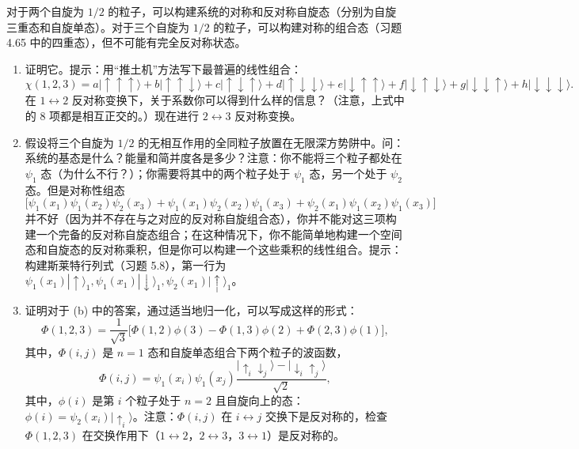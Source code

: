 \begin{question}
对于两个自旋为 $1/2$ 的粒子，可以构建系统的对称和反对称自旋态（分别为自旋三重态和自旋单态）。对于三个自旋为 $1/2$ 的粒子，可以构建对称的组合态（习题 4.65 中的四重态），但不可能有完全反对称状态。
\begin{enumerate}
\item 证明它。提示：用“推土机”方法写下最普遍的线性组合：
\[
\chi(1,2,3)=a|\uparrow\uparrow\uparrow\rangle+b|\uparrow\uparrow\downarrow\rangle+c|\uparrow\downarrow\uparrow\rangle+d|\uparrow\downarrow\downarrow\rangle+e|\downarrow\uparrow\uparrow\rangle+f|\downarrow\uparrow\downarrow\rangle+g|\downarrow\downarrow\uparrow\rangle+h|\downarrow\downarrow\downarrow\rangle.
\]
在 $1\leftrightarrow 2$ 反对称变换下，关于系数你可以得到什么样的信息？（注意，上式中的 8 项都是相互正交的。）现在进行 $2\leftrightarrow 3$ 反对称变换。
\item 假设将三个自旋为 $1/2$ 的无相互作用的全同粒子放置在无限深方势阱中。问：系统的基态是什么？能量和简并度各是多少？注意：你不能将三个粒子都处在 $\psi_1$ 态（为什么不行？）；你需要将其中的两个粒子处于 $\psi_1$ 态，另一个处于 $\psi_2$ 态。但是对称性组态
\[
\bigl[\psi_1(x_1)\psi_1(x_2)\psi_2(x_3)+\psi_1(x_1)\psi_2(x_2)\psi_1(x_3)+\psi_2(x_1)\psi_1(x_2)\psi_1(x_3)\bigr]
\]
并不好（因为并不存在与之对应的反对称自旋组合态），你并不能对这三项构建一个完备的反对称自旋态组合；在这种情况下，你不能简单地构建一个空间态和自旋态的反对称乘积，但是你可以构建一个这些乘积的线性组合。提示：构建斯莱特行列式（习题 5.8），第一行为 $\psi_1(x_1)|\uparrow\rangle_1,\psi_1(x_1)|\downarrow\rangle_1,\psi_2(x_1)|\uparrow\rangle_1$。
\item 证明对于 (b) 中的答案，通过适当地归一化，可以写成这样的形式：
\[
\Phi(1,2,3)=\frac{1}{\sqrt3}\bigl[\Phi(1,2)\phi(3)-\Phi(1,3)\phi(2)+\Phi(2,3)\phi(1)\bigr],
\]
其中，$\Phi(i,j)$ 是 $n=1$ 态和自旋单态组合下两个粒子的波函数，
\[
\Phi(i,j)=\psi_1(x_i)\psi_1(x_j)\frac{|\uparrow_i\downarrow_j\rangle-|\downarrow_i\uparrow_j\rangle}{\sqrt2},
\]
其中，$\phi(i)$ 是第 $i$ 个粒子处于 $n=2$ 且自旋向上的态：$\phi(i)=\psi_2(x_i)|\uparrow_i\rangle$。注意：$\Phi(i,j)$ 在 $i\leftrightarrow j$ 交换下是反对称的，检查 $\Phi(1,2,3)$ 在交换作用下（$1\leftrightarrow2$，$2\leftrightarrow3$，$3\leftrightarrow1$）是反对称的。
\end{enumerate}
\end{question}

